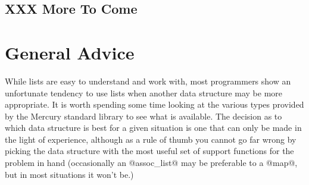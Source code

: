 \subsection{XXX More To Come}

\section{General Advice}


While lists are easy to understand and work with, most programmers show
an unfortunate tendency to use lists when another data structure may be
more appropriate.  It is worth spending some time looking at the various
types provided by the Mercury standard library to see what is available.
The decision as to which data structure is best for a given situation is
one that can only be made in the light of experience, although as a rule
of thumb you cannot go far wrong by picking the data structure with the
most useful set of support functions for the problem in hand
(occasionally an @assoc_list@ may be preferable to a @map@, but in most
situations it won't be.)

